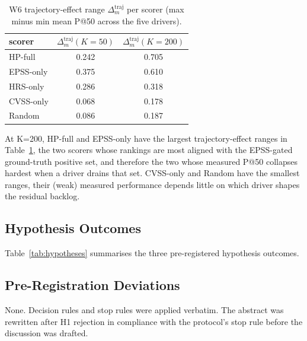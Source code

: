 \begin{table}[!t]
\caption{W6 trajectory-effect range $\Delta^{\mathrm{traj}}_m$ per
scorer (max minus min mean P@50 across the five drivers).}
\label{tab:trajeffect}
\centering
\small
\begin{tabular}{lcc}
\toprule
scorer & $\Delta^{\mathrm{traj}}_m(K=50)$ & $\Delta^{\mathrm{traj}}_m(K=200)$ \\
\midrule
HP-full & 0.242 & 0.705 \\
EPSS-only & 0.375 & 0.610 \\
HRS-only & 0.286 & 0.318 \\
CVSS-only & 0.068 & 0.178 \\
Random & 0.086 & 0.187 \\
\bottomrule
\end{tabular}
\end{table}

At K=200, HP-full and EPSS-only have the largest trajectory-effect
ranges in Table~\ref{tab:trajeffect}, the two scorers whose
rankings are most aligned with the EPSS-gated ground-truth positive
set, and therefore the two whose measured P@50 collapses hardest when
a driver drains that set. CVSS-only and Random have the smallest
ranges, their (weak) measured performance depends little on which
driver shapes the residual backlog.

\subsection{Hypothesis Outcomes}

Table~\ref{tab:hypotheses} summarises the three pre-registered
hypothesis outcomes.



\subsection{Pre-Registration Deviations}

None. Decision rules and stop rules were applied verbatim. The abstract
was rewritten after H1 rejection in compliance with the protocol's
stop rule before the discussion was drafted.
